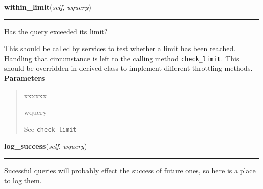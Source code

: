     \label{biblio:webquery:querythrottle:BaseQueryThrottle:within_limit}

    \vspace{0.5ex}

\hspace{.8\funcindent}\begin{boxedminipage}{\funcwidth}

    \raggedright \textbf{within\_limit}(\textit{self}, \textit{wquery})

    \vspace{-1.5ex}

    \rule{\textwidth}{0.5\fboxrule}
\setlength{\parskip}{2ex}

Has the query exceeded its limit?

This should be called by services to test whether a limit has been
reached. Handling that circumstance is left to the calling method
\texttt{check{\_}limit}. This should be overridden in derived class to implement
different throttling methods.
\setlength{\parskip}{1ex}
      \textbf{Parameters}
      \vspace{-1ex}

      \begin{quote}
        \begin{Ventry}{xxxxxx}

          \item[wquery]


See \texttt{check{\_}limit}
        \end{Ventry}

      \end{quote}

    \end{boxedminipage}

    \label{biblio:webquery:querythrottle:BaseQueryThrottle:log_success}

    \vspace{0.5ex}

\hspace{.8\funcindent}\begin{boxedminipage}{\funcwidth}

    \raggedright \textbf{log\_success}(\textit{self}, \textit{wquery})

    \vspace{-1.5ex}

    \rule{\textwidth}{0.5\fboxrule}
\setlength{\parskip}{2ex}

Sucessful queries will probably effect the success of future ones, so
here is a place to log them.
\setlength{\parskip}{1ex}
    \end{boxedminipage}


